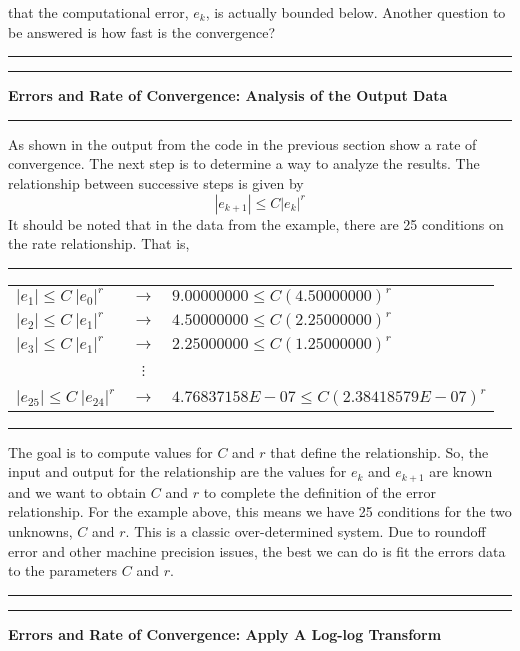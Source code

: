 \documentclass[10pt,fleqn]{article}
\begin{document}
that the computational error, $e_k$, is actually bounded below. Another question
to be answered is how fast is the convergence?
\vskip0.1in\hrule\vskip0.1in
\newpage
\vskip0.1in\hrule\vskip0.1in
\noindent
{\bf Errors and Rate of Convergence: Analysis of the Output Data}
\vskip0.1in\hrule\vskip0.1in
\noindent
As shown in the output from the code in the previous section show a rate of
convergence. The next step is to determine a way to analyze the results. The
relationship between successive steps is given by
$$
  | e_{k+1} | \leq C | e_k |^r
$$
It should be noted that in the data from the example, there are 25 conditions
on the rate relationship. That is,
\vskip0.1in\hrule\vskip0.1in
\begin{center}
  \begin{tabular}{lcl}
    $| e_1 | \leq C\ | e_0 |^r$ & $\rightarrow$
                              & $9.00000000 \leq C ( 4.50000000 )^r$ \\
    $| e_2 | \leq C\ | e_1 |^r$ & $\rightarrow$ 
                              & $4.50000000 \leq C ( 2.25000000 )^r$ \\
    $| e_3 | \leq C\ | e_1 |^r$ & $\rightarrow$
                              & $2.25000000 \leq C ( 1.25000000 )^r$ \\
    \ & $\vdots$ & \ \\
    $| e_{25} | \leq C\ | e_{24} |^r$ & $\rightarrow$
                              & $4.76837158E-07 \leq C (2.38418579E-07)^r$
  \end{tabular}
\end{center}
\vskip0.1in\hrule\vskip0.1in
The goal is to compute values for $C$ and $r$ that define the relationship. So,
the input and output for the relationship are the values for $e_k$ and $e_{k+1}$
are known and we want to obtain $C$ and $r$ to complete the definition of the
error relationship. For the example above, this means we have 25 conditions for
the two unknowns, $C$ and $r$. This is a classic over-determined system. Due to
roundoff error and other machine precision issues, the best we can do is fit
the errors data to the parameters $C$ and $r$.
\vskip0.1in\hrule\vskip0.1in
\newpage
\vskip0.1in\hrule\vskip0.1in
\noindent
{\bf Errors and Rate of Convergence: Apply A Log-log Transform}
\end{document}
